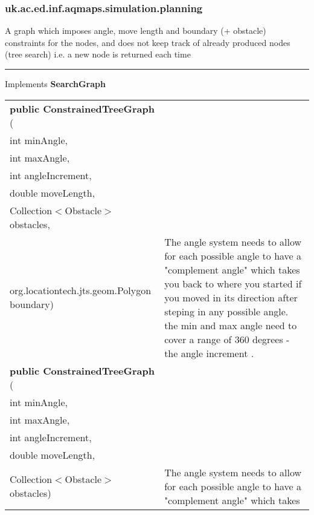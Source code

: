\subsubsection{ uk.ac.ed.inf.aqmaps.simulation.planning }
 { A graph which imposes angle, move length and boundary (+ obstacle) constraints for the nodes, and does not keep track of already produced nodes (tree search) i.e. a new node is returned each time
 
\vspace*{4pt} \hrule \vspace*{3pt}
Implements \textbf{ SearchGraph }
\begin{tabular}{ p{3in}|m{3.4in}}
\textbf{public ConstrainedTreeGraph } (\\ \hspace*{ 5pt} int minAngle,\\\hspace*{ 5pt} int maxAngle,\\\hspace*{ 5pt} int angleIncrement,\\\hspace*{ 5pt} double moveLength,\\\hspace*{ 5pt} Collection$<$Obstacle$>$ obstacles,\\\hspace*{ 5pt} org.locationtech.jts.geom.Polygon boundary) & The angle system needs to allow for each possible angle to have a "complement angle" which takes\newline%
 you back to where you started if you moved in its direction after steping in any possible angle.\newline%
 the min and max angle need to cover a range of 360 degrees {-} the angle increment .\\ \hline 
\textbf{public ConstrainedTreeGraph } (\\ \hspace*{ 5pt} int minAngle,\\\hspace*{ 5pt} int maxAngle,\\\hspace*{ 5pt} int angleIncrement,\\\hspace*{ 5pt} double moveLength,\\\hspace*{ 5pt} Collection$<$Obstacle$>$ obstacles) & The angle system needs to allow for each possible angle to have a "complement angle" which takes\newline%

\end{tabular}}
